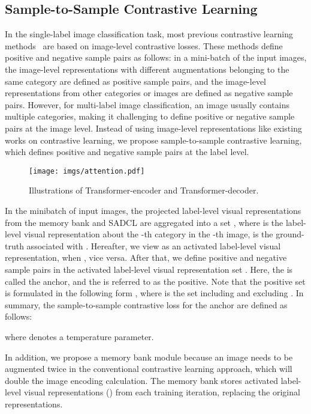 \documentclass{ecai}
\begin{document}
\subsection{Sample-to-Sample Contrastive Learning}
\label{SSCL}
In the single-label image classification task, most previous contrastive learning methods~\cite{he2020momentum,khosla2020supervised} are based on image-level contrastive losses.
These methods define positive and negative sample pairs as follows: in a mini-batch of the input images, the image-level representations with different augmentations belonging to the same category are defined as positive sample pairs, and the image-level representations from other categories or images are defined as negative sample pairs.
However, for multi-label image classification, an image usually contains multiple categories, making it challenging to define positive or negative sample pairs at the image level.
Instead of using image-level representations like existing works on contrastive learning, we propose sample-to-sample contrastive learning, which defines positive and negative sample pairs at the label level.
\begin{figure}[!t]
	\begin{center}
		\texttt{[image: imgs/attention.pdf]}
		\caption{Illustrations of Transformer-encoder and Transformer-decoder.
		}\label{fig3}
	\end{center}
\end{figure}
In the minibatch of  input images, the projected label-level visual representations from the memory bank and SADCL are aggregated into a set , where  is the label-level visual representation about the -th category in the -th image,  is the ground-truth associated with .
Hereafter, we view  as an activated label-level visual representation, when , vice versa.
After that, we define positive and negative sample pairs in the activated label-level visual representation set .
Here, the  is called the anchor, and the  is referred to as the positive.
Note that the positive set is formulated in the following form , where  is the set including  and excluding .
In summary, the sample-to-sample contrastive loss for the anchor  are defined as follows:

where  denotes a temperature parameter.

In addition, we propose a memory bank module because an image needs to be augmented twice in the conventional contrastive learning approach, which will double the image encoding calculation.
The memory bank stores activated label-level visual representations () from each training iteration, replacing the original representations.	
\end{document}
